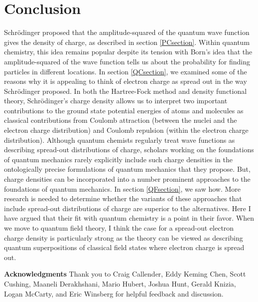 \documentclass[onecolumn,secnumarabic,amsmath,amssymb,balancelastpage,nofootinbib]{article}
\begin{document}
\section{Conclusion}

Schr\"{o}dinger proposed that the amplitude-squared of the quantum wave function gives the density of charge, as described in section \ref{PCsection}.  Within quantum chemistry, this idea remains popular despite its tension with Born's idea that the amplitude-squared of the wave function tells us about the probability for finding particles in different locations.  In section \ref{QCsection}, we examined some of the reasons why it is appealing to think of electron charge as spread out in the way Schr\"{o}dinger proposed.  In both the Hartree-Fock method and density functional theory, Schr\"{o}dinger's charge density allows us to interpret two important contributions to the ground state potential energies of atoms and molecules as classical contributions from Coulomb attraction (between the nuclei and the electron charge distribution) and Coulomb repulsion (within the electron charge distribution).  Although quantum chemists regularly treat wave functions as describing spread-out distributions of charge, scholars working on the foundations of quantum mechanics rarely explicitly include such charge densities in the ontologically precise formulations of quantum mechanics that they propose.  But, charge densities can be incorporated into a number prominent approaches to the foundations of quantum mechanics.  In section \ref{QFsection}, we saw how.  More research is needed to determine whether the variants of these approaches that include spread-out distributions of charge are superior to the alternatives.  Here I have argued that their fit with quantum chemistry is a point in their favor.  When we move to quantum field theory, I think the case for a spread-out electron charge density is particularly strong as the theory can be viewed as describing quantum superpositions of classical field states where electron charge is spread out.

\vspace*{12 pt}
\noindent
\textbf{Acknowledgments}
Thank you to Craig Callender, Eddy Keming Chen, Scott Cushing, Maaneli Derakhshani, Mario Hubert, Joshua Hunt, Gerald Knizia, Logan McCarty, and Eric Winsberg for helpful feedback and discussion.
\end{document}
